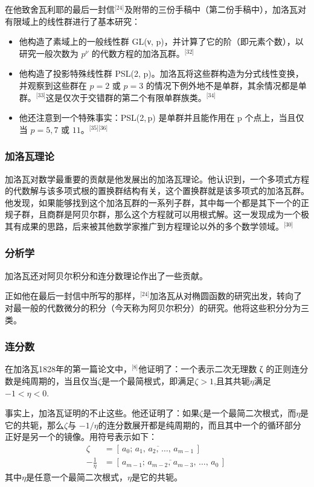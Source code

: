 在他致舍瓦利耶的最后一封信\(^\text{[24]}\)及附带的三份手稿中（第二份手稿中），加洛瓦对有限域上的线性群进行了基本研究：
\begin{itemize}
\item 他构造了素域上的一般线性群 GL(ν, p)，并计算了它的阶（即元素个数），以研究一般次数为 $p^\nu$ 的代数方程的加洛瓦群。\(^\text{[32]}\)
\item 他构造了投影特殊线性群 PSL(2, p)。加洛瓦将这些群构造为分式线性变换，并观察到这些群在 $p = 2$ 或 $p = 3$ 的情况下例外地不是单群，其余情况都是单群。\(^\text{[33]}\)这是仅次于交错群的第二个有限单群族类。\(^\text{[34]}\)
\item 他还注意到一个特殊事实：PSL(2, p) 是单群并且能作用在 p 个点上，当且仅当 $p = 5, 7$ 或 $11$。\(^\text{[35][36]}\)
\end{itemize}
\subsubsection{加洛瓦理论}
加洛瓦对数学最重要的贡献是他发展出的加洛瓦理论。他认识到，一个多项式方程的代数解与该多项式根的置换群结构有关，这个置换群就是该多项式的加洛瓦群。他发现，如果能够找到这个加洛瓦群的一系列子群，其中每一个都是其下一个的正规子群，且商群是阿贝尔群，那么这个方程就可以用根式解。这一发现成为一个极其有成果的思路，后来被其他数学家推广到方程理论以外的多个数学领域。\(^\text{[30]}\)
\subsubsection{分析学}
加洛瓦还对阿贝尔积分和连分数理论作出了一些贡献。

正如他在最后一封信中所写的那样，\(^\text{[24]}\)加洛瓦从对椭圆函数的研究出发，转向了对最一般的代数微分的积分（今天称为阿贝尔积分）的研究。他将这些积分分为三类。
\subsubsection{连分数}
在加洛瓦1828年的第一篇论文中，\(^\text{[8]}\)他证明了：一个表示二次无理数 ζ 的正则连分数是纯周期的，当且仅当$\zeta $是一个最简根式，即满足$\zeta > 1$,且其共轭$\eta$满足 $-1 < \eta < 0$.

事实上，加洛瓦证明的不止这些。他还证明了：如果$\zeta $是一个最简二次根式，而$\eta$是它的共轭，那么$\zeta $与 $-1/\eta$的连分数展开都是纯周期的，而且其中一个的循环部分正好是另一个的镜像。用符号表示如下：
$$
\begin{aligned}
\zeta &= [\,\overline{a_0;\,a_1,\,a_2,\,\dots,\,a_{m-1}}\,] \\
-\frac{1}{\eta} &= [\,\overline{a_{m-1};\,a_{m-2},\,a_{m-3},\,\dots,\,a_0}\,]
\end{aligned}~
$$
其中$\eta$是任意一个最简二次根式，$\eta$是它的共轭。
